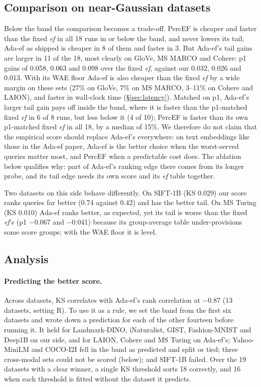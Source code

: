 \documentclass[sigconf,review=false,screen]{acmart}
\newcommand{\ef}{\textit{ef}}
\begin{document}
\subsection{Comparison on near-Gaussian datasets}\label{sec:neargauss}

Below the band the comparison becomes a trade-off. PercEF is cheaper and faster than the fixed \ef{}
in all 18 runs in or below the band, and never lowers its tail; Ada-ef as shipped is cheaper in 8 of
them and faster in 3. But Ada-ef's tail gains are larger in 11 of the 18, most clearly on GloVe,
MS MARCO and Cohere: p1 gains of 0.058, 0.063 and 0.098 over the fixed \ef{}, against our 0.032,
0.026 and 0.013. With its WAE floor Ada-ef is also cheaper than the fixed \ef{} by a wide margin on
these sets (27\% on GloVe, 7\% on MS MARCO, 3--11\% on Cohere and LAION), and faster in
wall-clock time (\S\ref{sec:latency}). Matched on p1, Ada-ef's larger tail gain pays off inside
the band, where it is faster than the p1-matched fixed \ef{} in 6 of 8 runs, but less below it (4
of 10); PercEF is faster than its own p1-matched fixed \ef{} in all 18, by a median of 15\%. We therefore do not claim that the empirical score should
replace Ada-ef's everywhere: on text embeddings like those in the Ada-ef paper, Ada-ef is the better
choice when the worst-served queries matter most, and PercEF when a predictable cost does. The
ablation below qualifies why: part of Ada-ef's ranking edge there comes from its longer probe, and
its tail edge needs its own score and its \ef{} table together.

Two datasets on this side behave differently. On SIFT-1B (KS 0.029) our score ranks queries far
better (0.74 against 0.42) and has the better tail. On MS Turing (KS 0.010) Ada-ef ranks better, as
expected, yet its tail is worse than the fixed \ef{}'s (p1 $-$0.067 and $-$0.041) because its
group-average table under-provisions some score groups; with the WAE floor it is level.

\subsection{Analysis}\label{sec:analysis}

\paragraph{Predicting the better score.}\label{sec:predict}
Across datasets, KS correlates with Ada-ef's rank correlation at $-0.87$ (13 datasets, setting R).
To use it as a rule, we set the band from the first six datasets and wrote down a prediction for
each of the other fourteen before running it. It held for Landmark-DINO, iNaturalist, GIST,
Fashion-MNIST and Deep1B on our side, and for LAION, Cohere and MS Turing on Ada-ef's; Yahoo-MiniLM
and COCO-I2I fell in the band as predicted and split or tied; three cross-modal sets could not be
scored (below); and SIFT-1B failed. Over the 19 datasets with a clear winner, a single KS threshold
sorts 18 correctly, and 16 when each threshold is fitted without the dataset it predicts.
\end{document}
